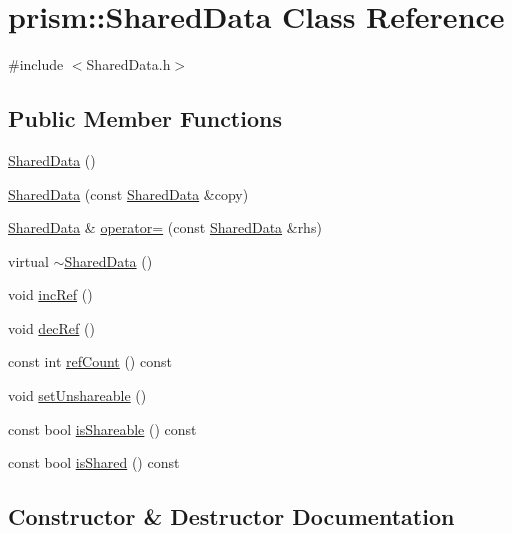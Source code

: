 \hypertarget{classprism_1_1_shared_data}{}\section{prism\+:\+:Shared\+Data Class Reference}
\label{classprism_1_1_shared_data}


{\ttfamily \#include $<$Shared\+Data.\+h$>$}

\subsection*{Public Member Functions}
\begin{DoxyCompactItemize}
\item 
\hyperlink{classprism_1_1_shared_data_a68d7aab69703ca6152731f1e041d6949}{Shared\+Data} ()
\item 
\hyperlink{classprism_1_1_shared_data_a90f3a23c943c077a2d23776ba0b207c1}{Shared\+Data} (const \hyperlink{classprism_1_1_shared_data}{Shared\+Data} \&copy)
\item 
\hyperlink{classprism_1_1_shared_data}{Shared\+Data} \& \hyperlink{classprism_1_1_shared_data_ab01467181ab0a5bd75afce8248c4bb65}{operator=} (const \hyperlink{classprism_1_1_shared_data}{Shared\+Data} \&rhs)
\item 
virtual \hyperlink{classprism_1_1_shared_data_ae726b22aee87a1551b46188482c92bc3}{$\sim$\+Shared\+Data} ()
\item 
void \hyperlink{classprism_1_1_shared_data_ae389431d573a0131b368c60531006fd2}{inc\+Ref} ()
\item 
void \hyperlink{classprism_1_1_shared_data_a270cf0cca02293714175d70acd92f049}{dec\+Ref} ()
\item 
const int \hyperlink{classprism_1_1_shared_data_a4886256c18ff603dece3cad4fb4f579b}{ref\+Count} () const 
\item 
void \hyperlink{classprism_1_1_shared_data_a09445f57e7dea60a37477a36d74365ac}{set\+Unshareable} ()
\item 
const bool \hyperlink{classprism_1_1_shared_data_a2c995e732a31d8f9a29c2fd46e0256ff}{is\+Shareable} () const 
\item 
const bool \hyperlink{classprism_1_1_shared_data_a2b919077f094e7d8970721b77677b584}{is\+Shared} () const 
\end{DoxyCompactItemize}


\subsection{Constructor \& Destructor Documentation}
